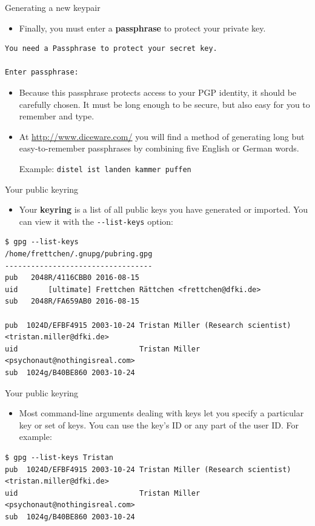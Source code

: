 \documentclass[
mode=present,
paper=smartboard,
size=20pt,
]{powerdot}
\newcommand\vsp{\vspace{-16mm}}
\newcommand{\clopt}[1]{\texttt{{-}#1}}
\begin{document}
\begin{slide}[method=direct,toc=]{Generating a new keypair}
  \begin{itemize}
  \item Finally, you must enter a \textbf{passphrase} to protect your
    private key.
  \end{itemize}
\vsp
\begin{verbatim}
You need a Passphrase to protect your secret key.    

Enter passphrase: 
\end{verbatim}

  \begin{itemize}
  \item Because this passphrase protects access to your PGP identity, it
    should be carefully chosen.  It must be long enough to be secure,
    but also easy for you to remember and type.
  \item At \url{http://www.diceware.com/} you will find a method of
    generating long but easy-to-remember passphrases by combining five
    English or German words.

    Example: \texttt{distel ist landen kammer puffen}
  \end{itemize}
\end{slide}

\begin{slide}[method=direct]{Your public keyring}
  \begin{itemize}
  \item Your \textbf{keyring} is a list of all public keys you have
    generated or imported.  You can view it with the
    \clopt{-list-keys} option:
  \end{itemize}
\begin{verbatim}
$ gpg --list-keys
/home/frettchen/.gnupg/pubring.gpg
----------------------------------
pub   2048R/4116CBB0 2016-08-15
uid       [ultimate] Frettchen Rättchen <frettchen@dfki.de>
sub   2048R/FA659AB0 2016-08-15

pub  1024D/EFBF4915 2003-10-24 Tristan Miller (Research scientist) <tristan.miller@dfki.de>
uid                            Tristan Miller <psychonaut@nothingisreal.com>
sub  1024g/B40BE860 2003-10-24
\end{verbatim}
\end{slide}

\begin{slide}[method=direct,toc=]{Your public keyring}
  \begin{itemize}
  \item Most command-line arguments dealing with keys let you specify
    a particular key or set of keys.  You can use the key's ID or any
    part of the user ID.  For example:
  \end{itemize}
\begin{verbatim}
$ gpg --list-keys Tristan
pub  1024D/EFBF4915 2003-10-24 Tristan Miller (Research scientist) <tristan.miller@dfki.de>
uid                            Tristan Miller <psychonaut@nothingisreal.com>
sub  1024g/B40BE860 2003-10-24
\end{verbatim}
\end{slide}
\end{document}
